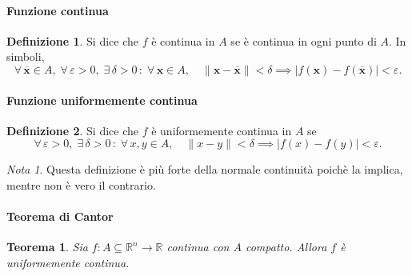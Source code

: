 \documentclass{article}
\theoremstyle{plain}
\newtheorem{thm}{Teorema}[section]
\theoremstyle{definition}
\newtheorem{defn}{Definizione}[section]
\theoremstyle{remark}
\newtheorem{note}{Nota}
\begin{document}
\vspace{10pt}

\paragraph{Funzione continua}
\begin{bxthm}
\begin{defn}
    Si dice che $f$ è continua in $A$ se è continua in ogni punto di $A$.
    In simboli,
    \[\forall\, \overline{\mathbf{x}}\in A,\;\forall\,\varepsilon>0,\;\exists\,\delta>0\,:\;\forall\, \mathbf{x}\in A,\quad\| \mathbf{x}-\overline{\mathbf{x}} \|<\delta \implies|f(\mathbf{x})-f(\overline{\mathbf{x}})|<\varepsilon.\]
\end{defn}
\end{bxthm}

\vspace{10pt}

\paragraph{Funzione uniformemente continua}
\begin{bxthm}
\begin{defn}
    Si dice che $f$ è uniformemente continua in $A$ se 
    \[\forall\,\varepsilon>0,\;\exists\,\delta>0\,:\;\forall\, x,y\in A,\quad\| x-y \|<\delta\implies |f(x)-f(y)|<\varepsilon.\]
\end{defn}
\end{bxthm}

\vspace{10pt}

\begin{note}
    Questa definizione è più forte della normale continuità poichè la implica, mentre non è vero il contrario.
\end{note}

\vspace{10pt}

\paragraph{Teorema di Cantor}
\begin{bxthm}
\begin{thm}
    Sia $f:A\subseteq\mathbb{R}^n\to\mathbb{R}$ continua con $A$ compatto.
    Allora $f$ è uniformemente continua.
\end{thm}
\end{bxthm}

\vspace{10pt}
\end{document}
